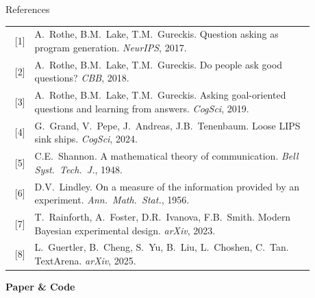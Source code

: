 \documentclass[final]{beamer}
\newlength{\sepwidth}
\newlength{\colwidth}
\begin{document}
\begin{frame}[t,fragile]
\begin{columns}[t]
\begin{column}{\colwidth}
\begin{block}{References}
{%
\footnotesize
\begin{minipage}[t]{0.85\colwidth}
\begin{tabular}{@{}r@{\;\;}p{0.92\linewidth}@{}}
{[1]} & A.~Rothe, B.M.~Lake, T.M.~Gureckis. Question asking as program generation. \textit{NeurIPS}, 2017. \\
{[2]} & A.~Rothe, B.M.~Lake, T.M.~Gureckis. Do people ask good questions? \textit{CBB}, 2018. \\
{[3]} & A.~Rothe, B.M.~Lake, T.M.~Gureckis. Asking goal-oriented questions and learning from answers. \textit{CogSci}, 2019. \\
{[4]} & G.~Grand, V.~Pepe, J.~Andreas, J.B.~Tenenbaum. Loose LIPS sink ships. \textit{CogSci}, 2024. \\
{[5]} & C.E.~Shannon. A mathematical theory of communication. \textit{Bell Syst.\ Tech.\ J.}, 1948. \\
{[6]} & D.V.~Lindley. On a measure of the information provided by an experiment. \textit{Ann.\ Math.\ Stat.}, 1956. \\
{[7]} & T.~Rainforth, A.~Foster, D.R.~Ivanova, F.B.~Smith. Modern Bayesian experimental design. \textit{arXiv}, 2023. \\
{[8]} & L.~Guertler, B.~Cheng, S.~Yu, B.~Liu, L.~Choshen, C.~Tan. TextArena. \textit{arXiv}, 2025. \\
\end{tabular}
\end{minipage}\hfill
\begin{minipage}[t]{0.12\colwidth}
  \centering
  \par\vspace{0.5ex}
  {\sffamily\scriptsize\textbf{Paper \& Code}}
\end{minipage}%
}

\end{block}

\end{column}
\begin{column}{\sepwidth}\end{column}


\end{columns}
\end{frame}
\end{document}
